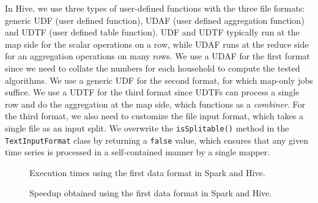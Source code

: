 \documentclass[prodmode,acmtods]{acmsmall}
\begin{document}
In Hive, we use three types of user-defined functions with the three file formats: generic UDF (user defined function), UDAF (user defined aggregation function) and UDTF (user defined table function). UDF and UDTF typically run at the map side for the scalar operations on a row, while UDAF runs at the reduce side for an aggregation operations on many rows. We use a UDAF for the first format since we need to collate the numbers for each household to compute the tested algorithms.  We use a generic UDF for the second format, for which map-only jobs suffice. We use a UDTF for the third format since UDTFs can process a single row and do the aggregation at the map side, which functions as a {\em combiner}. For the third format, we also need to customize the file input format, which takes a single file as an input split.  We overwrite the \texttt{isSplitable()} method in the \texttt{TextInputFormat} class by returning a \texttt{false} value, which ensures that any given time series is processed in a self-contained manner by a single mapper.

\begin{figure*}[t]
 \centering
 \hspace{-5pt}
 \hspace{-5pt}
 \hspace{-5pt}
 \caption{Execution times using the first data format in Spark and Hive.}
  \label{fig:scalabilityfirstformat}
\end{figure*}


\begin{figure*}[t]
 \centering
 \hspace{-8pt}
 \hspace{-8pt}
 \hspace{-8pt}
 \caption{Speedup obtained using the first data format in Spark and Hive.}
  \label{fig:speedupfirstformat}
\end{figure*}
\end{document}

